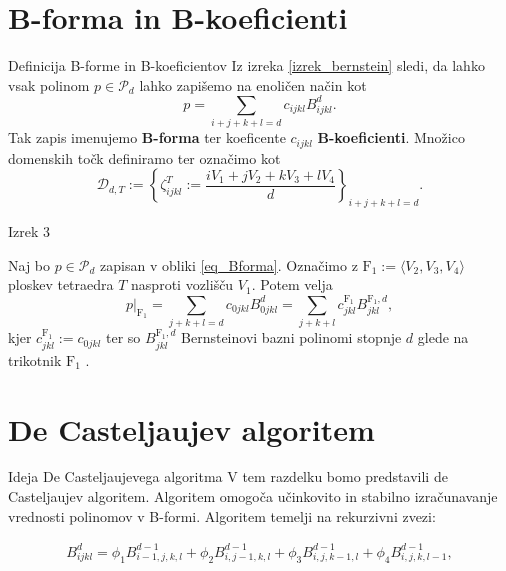 \documentclass{beamer}
\begin{document}
\section{B-forma in B-koeficienti}
\begin{frame}{Definicija B-forme in B-koeficientov}
Iz izreka \ref{izrek_bernstein} sledi, da lahko vsak polinom $p \in \mathcal{P}_d$
lahko zapišemo na enoličen način kot
\begin{equation}\label{eq_Bforma}
    p = \sum_{i+j+k+l = d} c_{ijkl} B_{ijkl}^d.
\end{equation}
Tak zapis imenujemo \textbf{B-forma} ter koeficente $c_{ijkl}$ \textbf{B-koeficienti}.
Množico domenskih točk definiramo ter označimo kot
\begin{equation}
    \mathcal{D}_{d,T} := 
    \left\{
        \zeta_{ijkl}^T:= \frac{i V_1 + j V_2 + k V_3 + l V_4}{d}
     \right\}_{i + j+ k+l = d}.
\end{equation}
\end{frame}


\begin{frame}{Izrek 3}
\begin{theorem}
    Naj bo $p \in \mathcal{P}_d$ zapisan v obliki \eqref{eq_Bforma}. Označimo 
    z $\text{F}_1 := \langle V_2,V_3,V_4 \rangle$ ploskev tetraedra $T$ nasproti vozlišču $V_1$.
    Potem velja 
    \begin{equation}
        p|_{\text{F}_1} = \sum_{j+k+l = d} c_{0jkl}B_{0jkl}^d = 
            \sum_{j+k+l}c_{jkl}^{\text{F}_1} B_{jkl}^{\text{F}_1,d},
    \end{equation}
    kjer $c_{jkl}^{\text{F}_1}:=c_{0jkl}$ ter so $B_{jkl}^{\text{F}_1,d}$
    Bernsteinovi bazni polinomi stopnje $d$ glede na trikotnik $\text{F}_1$ .
\end{theorem}
\end{frame}

\section{De Casteljaujev algoritem}
\begin{frame}{Ideja De Casteljaujevega algoritma}
V tem razdelku bomo predstavili de Casteljaujev algoritem. Algoritem omogoča učinkovito in stabilno izračunavanje vrednosti polinomov v B-formi. Algoritem temelji na rekurzivni zvezi:

\begin{align*}
 B_{ijkl}^d = \phi_1 B_{i-1,j,k,l}^{d-1} + \phi_2 B_{i,j-1,k,l}^{d-1} + \phi_3 B_{i,j,k-1,l}^{d-1} + \phi_4 B_{i,j,k,l-1}^{d-1}, 
\end{align*}
\end{frame}
\end{document}
